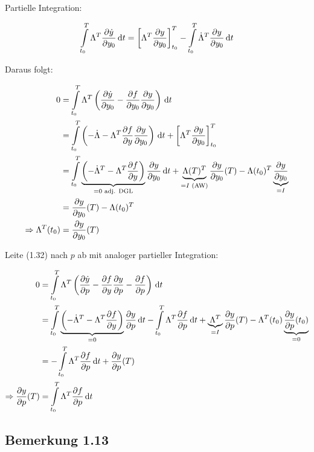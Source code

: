 Partielle Integration:

\[ \int\limits_{t_0}^T \Lambda^T \frac{\partial \dot y}{\partial y_0} \,\mathrm d t = \left[ \Lambda^T \frac{\partial y}{\partial y_0} \right]_{t_0}^T - \int\limits_{t_0}^T \dot \Lambda^T \frac{\partial y}{\partial y_0} \,\mathrm d t \]

Daraus folgt:

\begin{align*}
0 &= \int\limits_{t_0}^T \Lambda^T \left( \frac{\partial \dot y}{\partial y_0} - \frac{\partial f}{\partial y_0} \frac{\partial y}{\partial y_0} \right) \,\mathrm d t \\
&= \int\limits_{t_0}^T \left( -\dot \Lambda - \Lambda^T \frac{\partial f}{\partial y} \frac{\partial y}{\partial y_0} \right) \,\mathrm d t + \left[\Lambda^T \frac{\partial y}{\partial y_0} \right]_{t_0}^T \\
&= \int\limits_{t_0}^T \underbrace{\left( -\dot \Lambda^T - \Lambda^T \frac{\partial f}{\partial y} \right)}_{= 0 \text{ adj. DGL}} \frac{\partial y}{\partial y_0} \,\mathrm d t + \underbrace{\Lambda(T)^T}_{=I \text{ (AW)}} \frac{\partial y}{\partial y_0}(T) - \Lambda(t_0)^T \underbrace{\frac{\partial y}{\partial y_0}}_{=I} \\
&= \frac{\partial y}{\partial y_0} (T) - \Lambda(t_0)^T \\
\Rightarrow \Lambda^T(t_0) &= \frac{\partial y}{\partial y_0} (T) 
\end{align*}

Leite (1.32) nach $p$ ab mit analoger partieller Integration:

\begin{align*}
0 &= \int\limits_{t_0}^T \Lambda^T \left( \frac{\partial \dot y}{\partial p} - \frac{\partial f}{\partial y} \frac{\partial y}{\partial p} - \frac{\partial f}{\partial p} \right) \,\mathrm d t \\
&= \int\limits_{t_0}^T \underbrace{\left( -\dot \Lambda^T - \Lambda^T \frac{\partial f}{\partial y} \right)}_{= 0} \frac{\partial y}{\partial p} \,\mathrm d t - \int\limits_{t_0}^T \Lambda^T \frac{\partial f}{\partial p} \,\mathrm d t + \underbrace{\Lambda^T}_{=I} \frac{\partial y}{\partial p}(T) - \Lambda^T(t_0) \underbrace{\frac{\partial y}{\partial p}(t_0)}_{=0} \\
&= -\int\limits_{t_0}^T \Lambda^T \frac{\partial f}{\partial p} \,\mathrm d t + \frac{\partial y}{\partial p} (T) \\
\Rightarrow \frac{\partial y}{\partial p} (T) &= \int\limits_{t_0}^T \Lambda^T \frac{\partial f}{\partial p} \,\mathrm d t
\end{align*}

\subsection*{Bemerkung 1.13}

